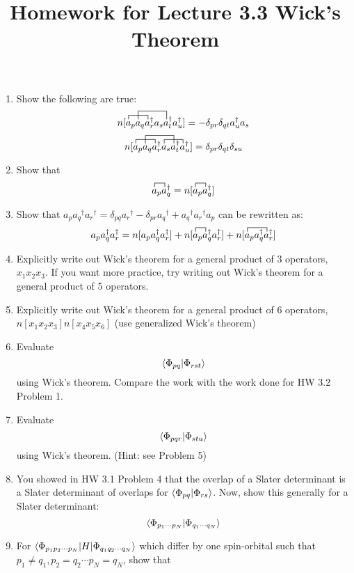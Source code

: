 \documentclass{article}
\title{Homework for Lecture 3.3 Wick's Theorem}
\date{}
\newcommand{\dg}{\ensuremath{^\dagger} }
\newcommand{\cd}{\ensuremath{\cdots} }
\begin{document}
\maketitle
\noindent
\begin{enumerate}
\item Show the following are true: 
 \[ \contraction{n[}{a}{{}_p a_q}{a}
\contraction[2ex]{n[a_p }{a}{{}_q a_r\dg a_s }{a}
n[a_p a_q a_r\dg a_s a_t\dg a_u\dg]  = -\delta_{pr}\delta_{qt} a_u\dg a_s\] 
 \[ \contraction{n[}{a}{{}_p a_q}{a}
\contraction[2ex]{n[a_p }{a}{{}_q a_r\dg a_s }{a}
\contraction{n[a_p a_q a_r\dg }{a}{{}_s a_t\dg }{a}
n[a_p a_q a_r\dg a_s a_t\dg a_u\dg]  = \delta_{pr}\delta_{qt} \delta_{su}\] 

\item Show that
\[\contraction{}{a}{{}_p}{a}a_p a_q\dg = n[\contraction{}{a}{{}_p}{a}a_p a_q\dg]\]


\item Show that $a_p a_q\dg a_r\dg  = \delta_{pq}a_r\dg - \delta_{pr} a_q\dg +  a_q\dg a_r\dg a_p$ can be rewritten as:
\[a_p a_q\dg a_r\dg  = n[a_p a_q\dg a_r\dg ] + n[\contraction{}{a}{{}_p}{a} a_p a_q\dg a_r\dg ]  + n[\contraction{}{a}{{}_p a_q\dg}{a} a_p a_q\dg a_r\dg ] \]

\item Explicitly write out Wick's theorem for a general product of 3 operators, $x_1 x_2 x_3$. If you want more practice, try writing out Wick's theorem for a general product of 5 operators. 

\item Explicitly write out Wick's theorem for a general product of 6 operators,  $n[x_1 x_2 x_3]n[ x_4 x_5 x_6]$ (use generalized Wick's theorem)

 \item Evaluate \[\braket{\Phi_{pq} | \Phi_{rst}} \] using Wick's theorem.
 Compare the work with the work done for HW 3.2 Problem 1. 
 
  \item Evaluate \[\braket{\Phi_{pqr} | \Phi_{stu}} \] using Wick's theorem.
(Hint: see Problem 5)
 
 \item You showed in HW 3.1 Problem 4 that the overlap of a Slater determinant is a Slater determinant of overlaps for $\braket{\Phi_{pq} | \Phi_{rs}}$.
 Now, show this generally for a Slater determinant:
 \[\braket{\Phi_{p_1 \cd p_N} | \Phi_{q_1 \cd q_N}} \]
 
 \item For $\braket{\Phi_{p_1 p_2 \cd p_N} | H | \Phi_{q_1 q_2 \cd q_N} }$ which differ by one spin-orbital such that $p_1 \neq q_1, p_2 = q_2 \cd p_N = q_N$, show that 
 

\end{enumerate}
\end{document}
